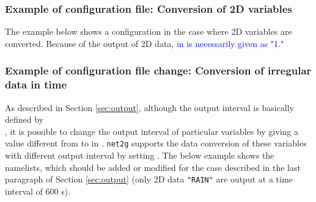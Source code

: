 \subsubsection{Example of configuration file: Conversion of 2D variables}
The example below shows a configuration in the case where 2D variables are converted. Because of the output of 2D data,
\textcolor{blue}{ in  is necessarily given as "1."}

\subsubsection{Example of configuration file change: Conversion of irregular data in time}

As described in Section \ref{sec:output},
although the output interval is basically defined by \\ ,
it is possible to change the output interval of particular variables
by giving a value different from   to  in .
\verb|net2g| supports the data conversion of these variables with different output interval by setting .
The below example shows the namelists, which should be added or modified
for the case described in the last paragraph of Section \ref{sec:output}
(only 2D data \verb|"RAIN"| are output at a time interval of 600 s).

